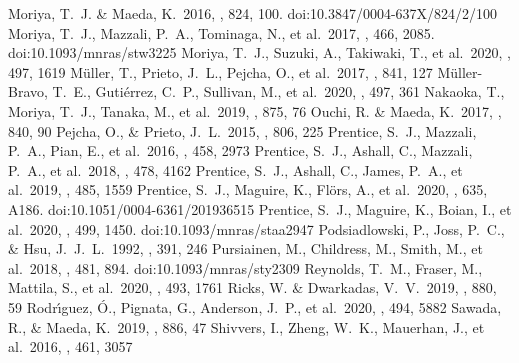 \documentclass[twocolumn, linenumbers]{aastex62}
\begin{document}
\begin{thebibliography}{99}
 Moriya, T.~J. \& Maeda, K.\ 2016, \apj, 824, 100. doi:10.3847/0004-637X/824/2/100
 Moriya, T.~J., Mazzali, P.~A., Tominaga, N., et al.\ 2017, \mnras, 466, 2085. doi:10.1093/mnras/stw3225
 Moriya, T.~J., Suzuki, A., Takiwaki, T., et al.\ 2020, \mnras, 497, 1619
 M{\"u}ller, T., Prieto, J.~L., Pejcha, O., et al.\ 2017, \apj, 841, 127
 M{\"u}ller-Bravo, T.~E., Guti{\'e}rrez, C.~P., Sullivan, M., et al.\ 2020, \mnras, 497, 361
 Nakaoka, T., Moriya, T.~J., Tanaka, M., et al.\ 2019, \apj, 875, 76
 Ouchi, R. \& Maeda, K.\ 2017, \apj, 840, 90
 Pejcha, O., \& Prieto, J.~L.\ 2015, \apj, 806, 225
 Prentice, S.~J., Mazzali, P.~A., Pian, E., et al.\ 2016, \mnras, 458, 2973
 Prentice, S.~J., Ashall, C., Mazzali, P.~A., et al.\ 2018, \mnras, 478, 4162
 Prentice, S.~J., Ashall, C., James, P.~A., et al.\ 2019, \mnras, 485, 1559
 Prentice, S.~J., Maguire, K., Fl{\"o}rs, A., et al.\ 2020, \aap, 635, A186. doi:10.1051/0004-6361/201936515
 Prentice, S.~J., Maguire, K., Boian, I., et al.\ 2020, \mnras, 499, 1450. doi:10.1093/mnras/staa2947
 Podsiadlowski, P., Joss, P.~C., \& Hsu, J.~J.~L.\ 1992, \apj, 391, 246
 Pursiainen, M., Childress, M., Smith, M., et al.\ 2018, \mnras, 481, 894. doi:10.1093/mnras/sty2309
 Reynolds, T.~M., Fraser, M., Mattila, S., et al.\ 2020, \mnras, 493, 1761
 Ricks, W. \& Dwarkadas, V.~V.\ 2019, \apj, 880, 59
 Rodr{\'\i}guez, {\'O}., Pignata, G., Anderson, J.~P., et al.\ 2020, \mnras, 494, 5882
 Sawada, R., \& Maeda, K.\ 2019, \apj, 886, 47
 Shivvers, I., Zheng, W.~K., Mauerhan, J., et al.\ 2016, \mnras, 461, 3057

\end{thebibliography}
\end{document}
